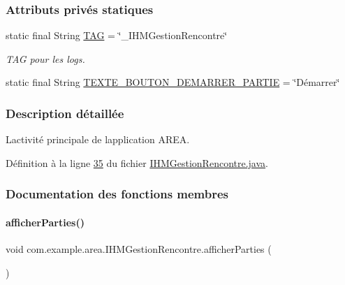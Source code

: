\subsubsection*{Attributs privés statiques}
\begin{DoxyCompactItemize}
\item 
static final String \hyperlink{classcom_1_1example_1_1area_1_1_i_h_m_gestion_rencontre_a0ac4d9152d48619cd697c8c69166219f}{T\+AG} = \char`\"{}\+\_\+\+I\+H\+M\+Gestion\+Rencontre\char`\"{}
\begin{DoxyCompactList}\small\item\em T\+AG pour les logs. \end{DoxyCompactList}\item 
static final String \hyperlink{classcom_1_1example_1_1area_1_1_i_h_m_gestion_rencontre_abd01f503f5a75a27b12261b30d80c053}{T\+E\+X\+T\+E\+\_\+\+B\+O\+U\+T\+O\+N\+\_\+\+D\+E\+M\+A\+R\+R\+E\+R\+\_\+\+P\+A\+R\+T\+IE} = \char`\"{}Démarrer\char`\"{}
\end{DoxyCompactItemize}


\subsubsection{Description détaillée}
L\textquotesingle{}activité principale de l\textquotesingle{}application A\+R\+EA. 

Définition à la ligne \hyperlink{_i_h_m_gestion_rencontre_8java_source_l00035}{35} du fichier \hyperlink{_i_h_m_gestion_rencontre_8java_source}{I\+H\+M\+Gestion\+Rencontre.\+java}.



\subsubsection{Documentation des fonctions membres}
\mbox{\label{classcom_1_1example_1_1area_1_1_i_h_m_gestion_rencontre_a5d86e4705a4bbea19f05781403df4742}} 
\paragraph{\texorpdfstring{afficher\+Parties()}{afficherParties()}}
{\footnotesize\ttfamily void com.\+example.\+area.\+I\+H\+M\+Gestion\+Rencontre.\+afficher\+Parties (\begin{DoxyParamCaption}{ }\end{DoxyParamCaption})\hspace{0.3cm}{\ttfamily [private]}}



